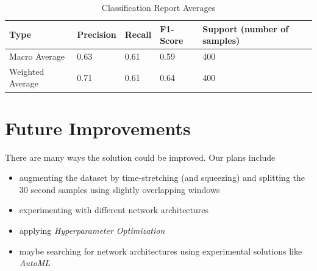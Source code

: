 \documentclass{article}
\begin{document}
    \begin{table}[h]
        \caption{Classification Report Averages}
        \centering
        \begin{tabular}{l | l l l l}
            Type & Precision & Recall & F1-Score & Support (number of samples) \\
            \midrule
            Macro Average & 0.63 & 0.61 & 0.59 & 400 \\
            Weighted Average & 0.71 & 0.61 & 0.64 & 400 \\
            \bottomrule
        \end{tabular}
    \end{table}

    \section{Future Improvements}

    There are many ways the solution could be improved. Our plans include

    \begin{itemize}
        \item augmenting the dataset by time-stretching (and squeezing) and splitting the 30 second
        samples using slightly overlapping windows
        \item experimenting with different network architectures
        \item applying \emph{Hyperparameter Optimization}
        \item maybe searching for network architectures using experimental solutions like \emph{AutoML}
    \end{itemize}

    
    
\end{document}
